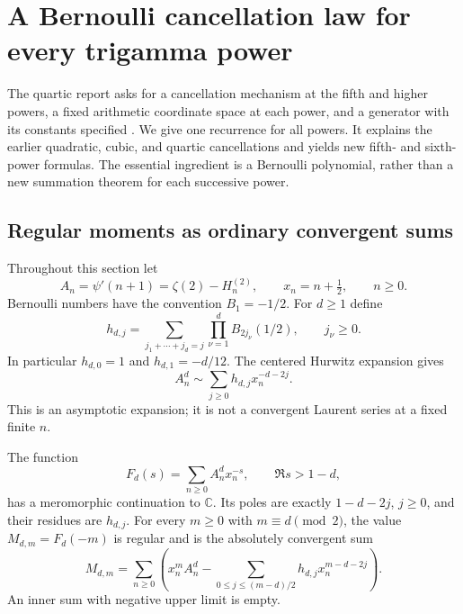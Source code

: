 \section{A Bernoulli cancellation law for every trigamma power}
\label{tp:sec:allpowers}

The quartic report asks for a cancellation mechanism at the fifth and
higher powers, a fixed arithmetic coordinate space at each power, and a
generator with its constants specified \cite[Research question R4]{RepoQuartic}.
We give one recurrence for all powers.  It explains the earlier quadratic,
cubic, and quartic cancellations and yields new fifth- and sixth-power
formulas.  The essential ingredient is a Bernoulli polynomial, rather than
a new summation theorem for each successive power.

\subsection{Regular moments as ordinary convergent sums}

Throughout this section let
\begin{equation}\label{tp:eq:tails}
 A_n=\psi'(n+1)=\zeta(2)-H_n^{(2)},\qquad x_n=n+\tfrac12,
 \qquad n\geq0.
\end{equation}
Bernoulli numbers have the convention $B_1=-1/2$.  For $d\geq1$ define
\begin{equation}\label{tp:eq:h}
 h_{d,j}=\sum_{j_1+\cdots+j_d=j}\prod_{\nu=1}^d B_{2j_\nu}(1/2),
 \qquad j_\nu\geq0.
\end{equation}
In particular $h_{d,0}=1$ and $h_{d,1}=-d/12$.  The centered
Hurwitz expansion \cite[\S25.11]{DLMF} gives
\begin{equation}\label{tp:eq:centeredasy}
 A_n^d\sim\sum_{j\geq0}h_{d,j}x_n^{-d-2j}.
\end{equation}
This is an asymptotic expansion; it is not a convergent Laurent series
at a fixed finite $n$.

\begin{proposition}
\label{tp:prop:ordinary}
The function
\[
 F_d(s)=\sum_{n\geq0}A_n^d x_n^{-s},\qquad \Re s>1-d,
\]
has a meromorphic continuation to $\mathbb C$.  Its poles are exactly
$1-d-2j$, $j\geq0$, and their residues are $h_{d,j}$.  For every
$m\geq0$ with $m\equiv d\pmod2$, the value $M_{d,m}=F_d(-m)$ is regular
and is the absolutely convergent sum
\begin{equation}\label{tp:eq:ordinary}
 M_{d,m}=\sum_{n\geq0}\left(
 x_n^m A_n^d-
 \sum_{0\leq j\leq(m-d)/2}h_{d,j}x_n^{m-d-2j}\right).
\end{equation}
An inner sum with negative upper limit is empty.
\end{proposition}

